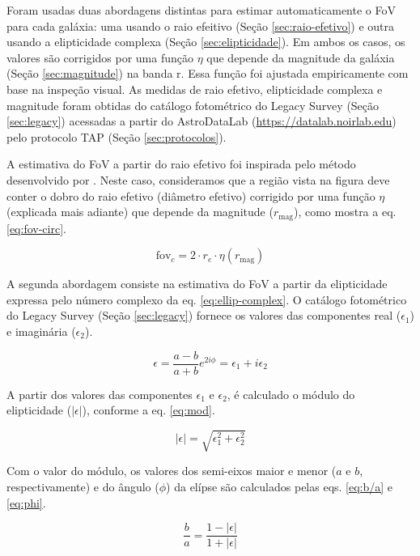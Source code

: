 Foram usadas duas abordagens distintas para estimar automaticamente o FoV para cada galáxia: uma usando o raio efeitivo (Seção \ref{sec:raio-efetivo}) e outra usando a elipticidade complexa (Seção \ref{sec:elipticidade}). Em ambos os casos, os valores são corrigidos por uma função $\eta$ que depende da magnitude da galáxia (Seção \ref{sec:magnitude}) na banda r. Essa função foi ajustada empiricamente com base na inspeção visual. As medidas de raio efetivo, elipticidade complexa e magnitude foram obtidas do catálogo fotométrico do Legacy Survey (Seção \ref{sec:legacy}) acessadas a partir do AstroDataLab (\url{https://datalab.noirlab.edu}) pelo protocolo TAP (Seção \ref{sec:protocolos}).

A estimativa do FoV a partir do raio efetivo foi inspirada pelo método desenvolvido por \citet{gz-decals}. Neste caso, consideramos que a região vista na figura deve conter o dobro do raio efetivo (diâmetro efetivo) corrigido por uma função $\eta$ (explicada mais adiante) que depende da magnitude ($r_\mathrm{mag}$), como mostra a eq. \eqref{eq:fov-circ}.

\begin{equation}\label{eq:fov-circ}
  \mathrm{fov}_c = 2 \cdot r_e \cdot \eta(r_\mathrm{mag})
\end{equation}

A segunda abordagem consiste na estimativa do FoV a partir da elipticidade expressa pelo número complexo da eq. \eqref{eq:ellip-complex}. O catálogo fotométrico do Legacy Survey (Seção \ref{sec:legacy}) fornece os valores das componentes real ($\epsilon_1$) e imaginária ($\epsilon_2$).

\begin{equation}\label{eq:ellip-complex}
  \epsilon = \frac{a-b}{a+b} e^{2i\phi} = \epsilon_1 + i\epsilon_2
\end{equation}


A partir dos valores das componentes $\epsilon_1$ e $\epsilon_2$, é calculado o módulo do elipticidade ($|\epsilon|$), conforme a eq. \eqref{eq:mod}.

\begin{equation}\label{eq:mod}
  |\epsilon| = \sqrt{\epsilon_1^2 + \epsilon_2^2}
\end{equation}

Com o valor do módulo, os valores dos semi-eixos maior e menor ($a$ e $b$, respectivamente) e do ângulo ($\phi$) da elípse são calculados pelas eqs. \eqref{eq:b/a} e \eqref{eq:phi}.

\begin{equation}\label{eq:b/a}
  \frac{b}{a} = \frac{1 - |\epsilon|}{1 + |\epsilon|}
\end{equation}

